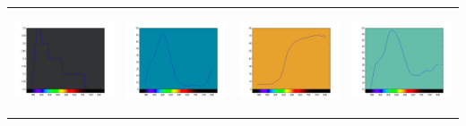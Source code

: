 \documentclass{amsart}
\theoremstyle{definition}
\theoremstyle{remark}
\numberwithin{equation}{section}
\begin{document}
\begin{tabular}{  c c c c }
\includegraphics[width=3.0cm,height=3.0cm]{images/ch1.jpg}
&
\includegraphics[width=3.0cm,height=3.0cm]{images/ch2.jpg}
&
\includegraphics[width=3.0cm,height=3.0cm]{images/ch3.jpg}
&
\includegraphics[width=3.0cm,height=3.0cm]{images/ch4.jpg}
\\


\end{tabular}
\end{document}
